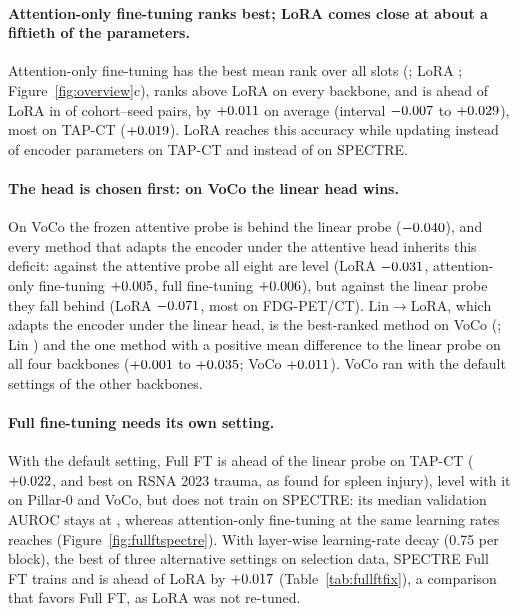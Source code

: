 \paragraph{Attention-only fine-tuning ranks best; LoRA comes close at about a fiftieth of the parameters.} Attention-only fine-tuning has the best mean rank over all slots (\numRankallAttnftMean{}; LoRA \numRankallLoraMean{}; Figure~\ref{fig:overview}c), ranks above LoRA on every backbone, and is ahead of LoRA in \numSeedsclsAttnftLoraAllPosN{} of \numSeedsclsAttnftLoraAllPairsN{} cohort--seed pairs, by $+0.011$ on average (interval $-0.007$ to $+0.029$), most on TAP-CT ($+0.019$). LoRA reaches this accuracy while updating \numParamsbbTapctLora{} instead of \numParamsbbTapctAttnft{} encoder parameters on TAP-CT and \numParamsbbSpectreLora{} instead of \numParamsbbSpectreAttnft{} on SPECTRE.

\paragraph{The head is chosen first: on VoCo the linear head wins.} On VoCo the frozen attentive probe is behind the linear probe ($-0.040$), and every method that adapts the encoder under the attentive head inherits this deficit: against the attentive probe all eight are level (LoRA $-0.031$, attention-only fine-tuning $+0.005$, full fine-tuning $+0.006$), but against the linear probe they fall behind (LoRA $-0.071$, most on FDG-PET/CT). Lin$\to$LoRA, which adapts the encoder under the linear head, is the best-ranked method on VoCo (\numVocorankLinThenLoragMean{}; Lin \numVocorankLinMean{}) and the one method with a positive mean difference to the linear probe on all four backbones ($+0.001$ to $+0.035$; VoCo $+0.011$). VoCo ran with the default settings of the other backbones.

\paragraph{Full fine-tuning needs its own setting.} With the default setting, Full FT is ahead of the linear probe on TAP-CT ($+0.022$, and best on RSNA 2023 trauma, as \citet{liu2025anymc3d} found for spleen injury), level with it on Pillar-0 and VoCo, but does not train on SPECTRE: its median validation AUROC stays at \numTrajSpectrefullftLast{}, whereas attention-only fine-tuning at the same learning rates reaches \numTrajSpectreattnftLast{} (Figure~\ref{fig:fullftspectre}). With layer-wise learning-rate decay (0.75 per block), the best of three alternative settings on selection data, SPECTRE Full FT trains and is ahead of LoRA by $+0.017$ (Table~\ref{tab:fullftfix}), a comparison that favors Full FT, as LoRA was not re-tuned.


